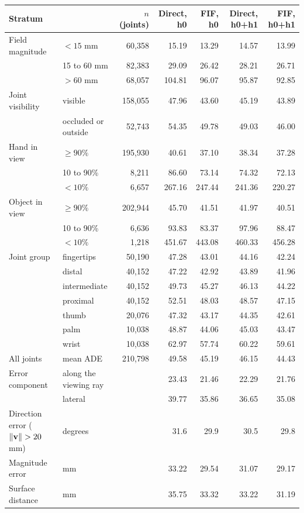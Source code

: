 \begin{tabular}{@{}llrrrrr@{}}
\toprule
Stratum & & $n$ (joints) & Direct, h0 & FIF, h0 & Direct, h0+h1 & FIF, h0+h1 \\
\midrule
Field magnitude & $<15$ mm & 60,358 & 15.19 & 13.29 & 14.57 & 13.99 \\
 & 15 to 60 mm & 82,383 & 29.09 & 26.42 & 28.21 & 26.71 \\
 & $>60$ mm & 68,057 & 104.81 & 96.07 & 95.87 & 92.85 \\
\midrule
Joint visibility & visible & 158,055 & 47.96 & 43.60 & 45.19 & 43.89 \\
 & occluded or outside & 52,743 & 54.35 & 49.78 & 49.03 & 46.00 \\
\midrule
Hand in view & $\geq 90\%$ & 195,930 & 40.61 & 37.10 & 38.34 & 37.28 \\
 & 10 to 90\% & 8,211 & 86.60 & 73.14 & 74.32 & 72.13 \\
 & $<10\%$ & 6,657 & 267.16 & 247.44 & 241.36 & 220.27 \\
\midrule
Object in view & $\geq 90\%$ & 202,944 & 45.70 & 41.51 & 41.97 & 40.51 \\
 & 10 to 90\% & 6,636 & 93.83 & 83.37 & 97.96 & 88.47 \\
 & $<10\%$ & 1,218 & 451.67 & 443.08 & 460.33 & 456.28 \\
\midrule
Joint group & fingertips & 50,190 & 47.28 & 43.01 & 44.16 & 42.24 \\
 & distal & 40,152 & 47.22 & 42.92 & 43.89 & 41.96 \\
 & intermediate & 40,152 & 49.73 & 45.27 & 46.13 & 44.22 \\
 & proximal & 40,152 & 52.51 & 48.03 & 48.57 & 47.15 \\
 & thumb & 20,076 & 47.32 & 43.17 & 44.35 & 42.61 \\
 & palm & 10,038 & 48.87 & 44.06 & 45.03 & 43.47 \\
 & wrist & 10,038 & 62.97 & 57.74 & 60.22 & 59.61 \\
\midrule
All joints & mean ADE & 210,798 & 49.58 & 45.19 & 46.15 & 44.43 \\
Error component & along the viewing ray & & 23.43 & 21.46 & 22.29 & 21.76 \\
 & lateral & & 39.77 & 35.86 & 36.65 & 35.08 \\
Direction error ($\|\field\|>20$ mm) & degrees & & 31.6 & 29.9 & 30.5 & 29.8 \\
Magnitude error & mm & & 33.22 & 29.54 & 31.07 & 29.17 \\
Surface distance & mm & & 35.75 & 33.32 & 33.22 & 31.19 \\
\bottomrule
\end{tabular}
